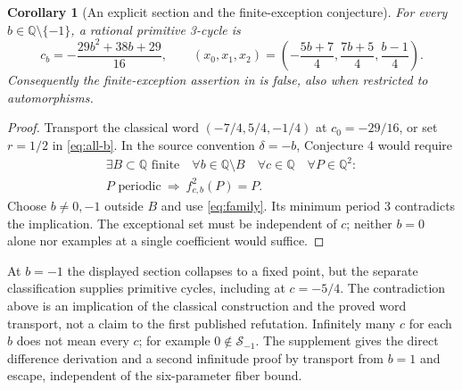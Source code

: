 \documentclass{jT}
\newcommand{\Q}{\mathbb Q}
\newtheorem{corollary}[proposition]{Corollary}
\begin{document}
\begin{corollary}[An explicit section and the finite-exception conjecture]\label{prop:family}
For every $b\in\Q\setminus\{-1\}$, a rational primitive 3-cycle is
\begin{equation}\label{eq:family}
c_b=-\frac{29b^2+38b+29}{16},\qquad
(x_0,x_1,x_2)=\left(-\frac{5b+7}{4},\frac{7b+5}{4},\frac{b-1}{4}\right).
\end{equation}
Consequently the finite-exception assertion in \cite[\S11, Conjecture 4]{problems} is false, also when restricted to automorphisms.
\end{corollary}
\begin{proof}
Transport the classical word $(-7/4,5/4,-1/4)$ at $c_0=-29/16$, or set $r=1/2$ in \eqref{eq:all-b}. In the source convention $\delta=-b$, Conjecture 4 would require
\begin{equation}\label{eq:c4}
\begin{gathered}
\exists B\subset\Q\text{ finite}\quad\forall b\in\Q\setminus B\quad
\forall c\in\Q\quad\forall P\in\Q^2:\\
P\text{ periodic}\ \Longrightarrow\ f_{c,b}^2(P)=P.
\end{gathered}
\end{equation}
Choose $b\ne0,-1$ outside $B$ and use \eqref{eq:family}. Its minimum period 3 contradicts the implication. The exceptional set must be independent of $c$; neither $b=0$ alone nor examples at a single coefficient would suffice.
\end{proof}
At $b=-1$ the displayed section collapses to a fixed point, but the separate classification supplies primitive cycles, including at $c=-5/4$. The contradiction above is an implication of the classical construction and the proved word transport, not a claim to the first published refutation. Infinitely many $c$ for each $b$ does not mean every $c$; for example $0\notin\mathcal S_{-1}$. The supplement gives the direct difference derivation and a second infinitude proof by transport from $b=1$ and escape, independent of the six-parameter fiber bound.
\end{document}
